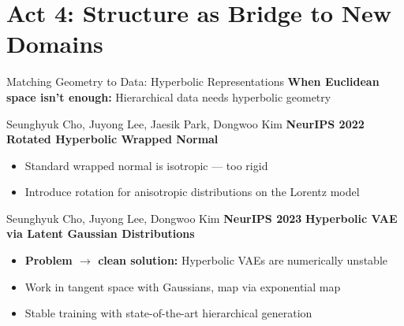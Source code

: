 \documentclass[aspectratio=169,11pt]{beamer}
\newcommand{\papercite}[1]{{\scriptsize\color{mutedText}#1}}
\newcommand{\venue}[1]{{\small\textcolor{postechBlue}{\textbf{#1}}}}
\begin{document}
\section{Act 4: Structure as Bridge to New Domains}

\begin{frame}{Matching Geometry to Data: Hyperbolic Representations}
  \textbf{When Euclidean space isn't enough:} Hierarchical data needs \alert{hyperbolic} geometry
  \vspace{8pt}

  \papercite{Seunghyuk Cho, Juyong Lee, Jaesik Park, Dongwoo Kim \hfill \venue{NeurIPS 2022}}
  \vspace{2pt}
  \textbf{Rotated Hyperbolic Wrapped Normal}
  \begin{itemize}
    \item Standard wrapped normal is isotropic --- too rigid
    \item Introduce \alert{rotation} for anisotropic distributions on the Lorentz model
  \end{itemize}

  \vspace{8pt}

  \papercite{Seunghyuk Cho, Juyong Lee, Dongwoo Kim \hfill \venue{NeurIPS 2023}}
  \vspace{2pt}
  \textbf{Hyperbolic VAE via Latent Gaussian Distributions}
  \begin{itemize}
    \item \textbf{Problem $\to$ clean solution:} Hyperbolic VAEs are numerically unstable
    \item Work in tangent space with Gaussians, map via exponential map
    \item Stable training with state-of-the-art hierarchical generation
  \end{itemize}
\end{frame}
\end{document}
